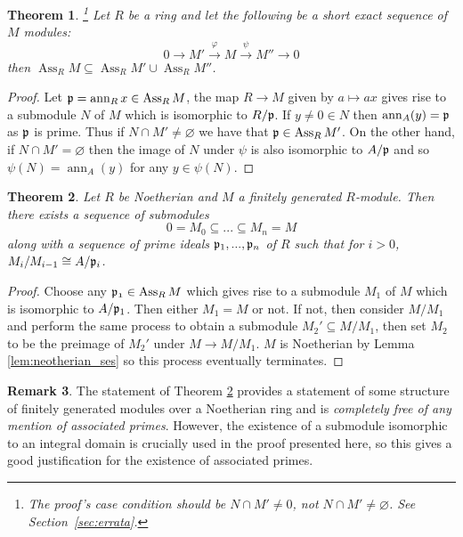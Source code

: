 \documentclass[12pt]{article}
\theoremstyle{plain}
\newtheorem{thm}{Theorem}[subsection] %
\theoremstyle{definition}
\newtheorem{remark}[thm]{Remark}
\newcommand{\lto}{\longrightarrow}
\begin{document}
\begin{thm}
\label{thm:shortexactsequence_ass}\footnote{The proof's case condition should be $N\cap M' \neq 0$, not $N\cap M' \neq \varnothing$. See Section~\ref{sec:errata}.}
Let $R$ be a ring and let the following be a short exact sequence of $M$ modules:
\[0 \lto M' \stackrel{\varphi}{\lto} M \stackrel{\psi}{\lto} M'' \lto 0\]
then $\operatorname{Ass}_RM \subseteq \operatorname{Ass}_RM' \cup \operatorname{Ass}_RM''$.
\end{thm}
\begin{proof}
Let $\frak{p} = \operatorname{ann}_Rx \in \operatorname{Ass}_RM$, the map $R \lto M$ given by $a \mapsto ax$ gives rise to a submodule $N$ of $M$ which is isomorphic to $R/\frak{p}$. If $y \neq 0 \in N$ then $\operatorname{ann}_A(y) = \frak{p}$ as $\frak{p}$ is prime. Thus if $N \cap M' \neq \varnothing$ we have that $\frak{p} \in \operatorname{Ass}_RM'$. On the other hand, if $N \cap M' = \varnothing$ then the image of $N$ under $\psi$ is also isomorphic to $A/\frak{p}$ and so $\psi(N) = \operatorname{ann}_A(y)$ for any $y \in \psi(N)$.
\end{proof}
\begin{thm}
\label{thm:sequence}
Let $R$ be Noetherian and $M$ a finitely generated $R$-module. Then there exists a sequence of submodules
\[0 = M_0 \subseteq ... \subseteq M_n = M\]
along with a sequence of prime ideals $\frak{p}_1,...,\frak{p}_n$ of $R$ such that for $i > 0$, $M_i/M_{i-1} \cong A/\frak{p}_i$.
\end{thm}
\begin{proof}
Choose any $\frak{p_1} \in \operatorname{Ass}_RM$ which gives rise to a submodule $M_1$ of $M$ which is isomorphic to $A/\frak{p}_1$. Then either $M_1 = M$ or not. If not, then consider $M/M_1$ and perform the same process to obtain a submodule $M_2' \subseteq M/M_1$, then set $M_2$ to be the preimage of $M_2'$ under $M \lto M/M_1$. $M$ is Noetherian by Lemma \ref{lem:neotherian_ses} so this process eventually terminates.
\end{proof}
\begin{remark}
The statement of Theorem \ref{thm:sequence} provides a statement of some structure of finitely generated modules over a Noetherian ring and is \emph{completely free of any mention of associated primes}. However, the existence of a submodule isomorphic to an integral domain is crucially used in the proof presented here, so this gives a good justification for the existence of associated primes.
\end{remark}
\end{document}

